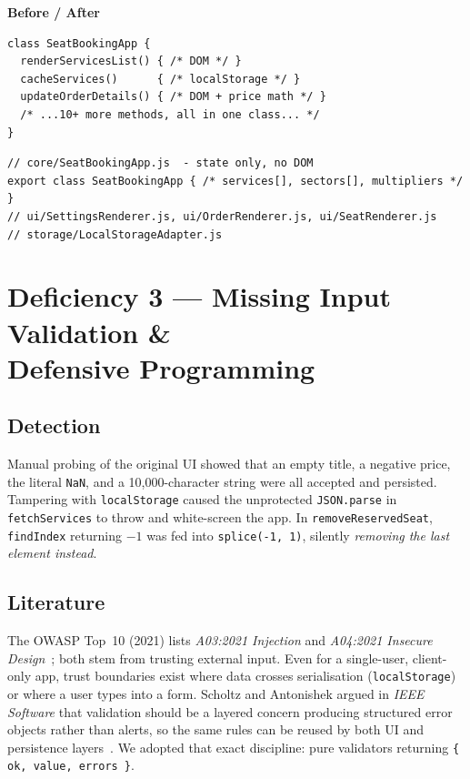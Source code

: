 \documentclass[a4paper,11pt]{article}
\begin{document}
\noindent\textbf{Before / After}
\begin{lstlisting}[caption={Original {\tt SeatBookingApp} mixing state, DOM and I/O.},captionpos=b]
class SeatBookingApp {
  renderServicesList() { /* DOM */ }
  cacheServices()      { /* localStorage */ }
  updateOrderDetails() { /* DOM + price math */ }
  /* ...10+ more methods, all in one class... */
}
\end{lstlisting}
\begin{lstlisting}[caption={Refactored: state vs.\ rendering vs.\ persistence are now separate modules.},captionpos=b]
// core/SeatBookingApp.js  - state only, no DOM
export class SeatBookingApp { /* services[], sectors[], multipliers */ }
// ui/SettingsRenderer.js, ui/OrderRenderer.js, ui/SeatRenderer.js
// storage/LocalStorageAdapter.js
\end{lstlisting}

\section{Deficiency 3 --- Missing Input Validation \&\\Defensive Programming}
\subsection{Detection}
Manual probing of the original UI showed that an empty title, a
negative price, the literal \texttt{NaN}, and a 10{,}000-character
string were all accepted and persisted.  Tampering with
\texttt{localStorage} caused the unprotected \texttt{JSON.parse} in
\texttt{fetchServices} to throw and white-screen the app.  In
\texttt{removeReservedSeat}, \texttt{findIndex} returning $-1$ was
fed into \texttt{splice(-1, 1)}, silently \emph{removing the last
element instead}.

\subsection{Literature}
The OWASP Top~10 (2021) lists \textit{A03:2021 Injection} and
\textit{A04:2021 Insecure Design}~\cite{owasp2021}; both stem from
trusting external input.  Even for a single-user, client-only app,
trust boundaries exist where data crosses serialisation
(\texttt{localStorage}) or where a user types into a form.
Scholtz and Antonishek argued in \textit{IEEE Software} that
validation should be a layered concern producing structured error
objects rather than alerts, so the same rules can be reused by both
UI and persistence layers~\cite{scholtz2003input}.  We adopted that
exact discipline: pure validators returning
\texttt{\{ ok, value, errors \}}.
\end{document}

